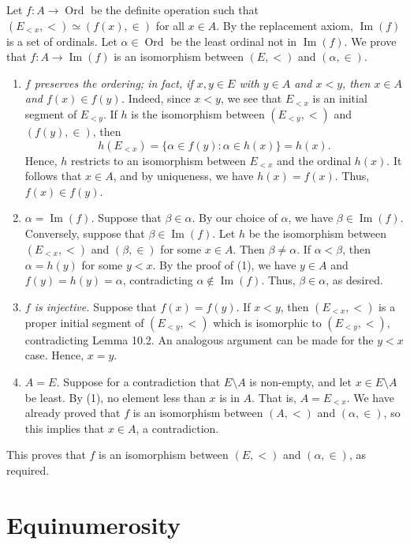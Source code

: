 \documentclass[10pt]{article}
\makeatletter
\DeclareMathOperator{\im}{Im}
\DeclareMathOperator{\Ord}{Ord}
\theoremstyle{newstyle}
\newenvironment{pf}[1][\proofname]{\par
  \pushQED{\qed}%
  \normalfont \topsep0\p@\relax
  \trivlist
  \item[\hskip\labelsep\scshape
  #1\@addpunct{.}]\ignorespaces
}{%
  \popQED\endtrivlist\@endpefalse
}
\makeatother
\begin{document}
\begin{pf}
Let $f : A \to \Ord$ be the definite operation such that $(E_{<x}, <) \simeq (f(x), \in)$ 
for all $x \in A$. By the replacement axiom, $\im(f)$ is a set of ordinals. 
Let $\alpha \in \Ord$ be the least ordinal not in $\im(f)$. We prove that 
$f : A \to \im(f)$ is an isomorphism between $(E, <)$ and $(\alpha, \in)$. 
\begin{enumerate}[(1)]
    \item {\em $f$ preserves the ordering; in fact, if $x, y \in E$ with $y \in A$ and 
    $x < y$, then $x \in A$ and $f(x) \in f(y)$.} Indeed, since $x < y$, we see that 
    $E_{<x}$ is an initial segment of $E_{<y}$. If $h$ is the isomorphism between 
    $(E_{<y}, <)$ and $(f(y), \in)$, then 
    \[ h(E_{<x}) = \{\alpha \in f(y) : \alpha \in h(x)\} = h(x). \]
    Hence, $h$ restricts to an isomorphism between $E_{<x}$ and the ordinal $h(x)$. 
    It follows that $x \in A$, and by uniqueness, we have $h(x) = f(x)$. 
    Thus, $f(x) \in f(y)$. 
    \item {\em $\alpha = \im(f)$.} Suppose that $\beta \in \alpha$. By our choice of $\alpha$, 
    we have $\beta \in \im(f)$. Conversely, suppose that $\beta \in \im(f)$. Let 
    $h$ be the isomorphism between $(E_{<x}, <)$ and $(\beta, \in)$ for some $x \in A$. 
    Then $\beta \neq \alpha$. If $\alpha < \beta$, then $\alpha = h(y)$ for some $y < x$. 
    By the proof of (1), we have $y \in A$ and $f(y) = h(y) = \alpha$, contradicting 
    $\alpha \notin \im(f)$. Thus, $\beta \in \alpha$, as desired. 
    \item {\em $f$ is injective.} Suppose that $f(x) = f(y)$. If $x < y$, then $(E_{<x}, <)$ 
    is a proper initial segment of $(E_{<y}, <)$ which is isomorphic to $(E_{<y}, <)$, 
    contradicting Lemma 10.2. An analogous argument can be made for the $y < x$ case. Hence, $x = y$. 
    \item {\em $A = E$.} Suppose for a contradiction that $E \setminus A$ is non-empty, 
    and let $x \in E \setminus A$ be least. By (1), no element less than $x$ is in $A$. 
    That is, $A = E_{<x}$. We have already proved that $f$ is an isomorphism between 
    $(A, <)$ and $(\alpha, \in)$, so this implies that $x \in A$, a contradiction. 
\end{enumerate} 
This proves that $f$ is an isomorphism between $(E, <)$ and $(\alpha, \in)$, as required.
\end{pf}

 
\newpage\section{Equinumerosity} 
\end{document}
